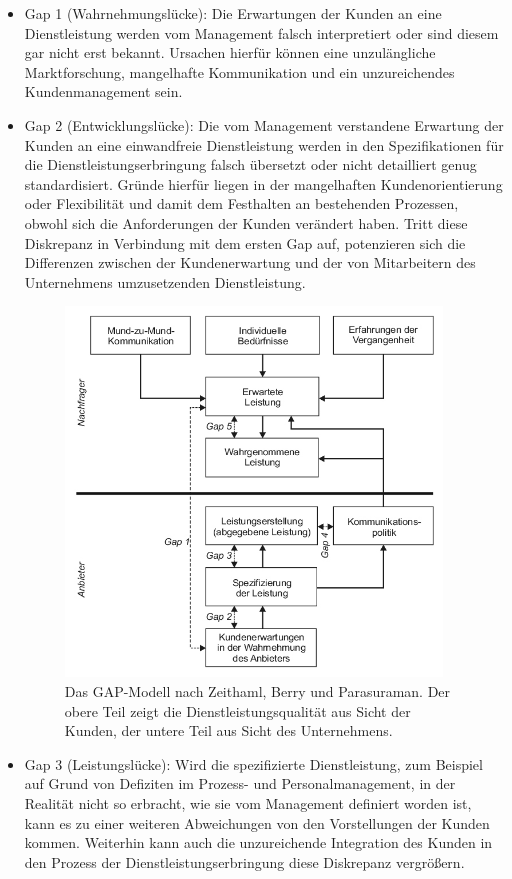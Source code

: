 \begin{itemize}
\item Gap 1 (Wahrnehmungslücke): Die Erwartungen der Kunden an eine Dienstleistung werden vom Management falsch interpretiert oder sind diesem gar nicht erst bekannt. Ursachen hierfür können eine unzulängliche Marktforschung, mangelhafte Kommunikation und ein unzureichendes Kundenmanagement sein.
\newpage
\item Gap 2 (Entwicklungslücke): Die vom Management verstandene Erwartung der Kunden an eine einwandfreie Dienstleistung werden in den Spezifikationen für die Dienstleistungserbringung falsch übersetzt oder nicht detailliert genug standardisiert. Gründe hierfür liegen in der mangelhaften Kundenorientierung oder Flexibilität und damit dem Festhalten an bestehenden Prozessen, obwohl sich die Anforderungen der Kunden verändert haben. Tritt diese Diskrepanz in Verbindung mit dem ersten Gap auf, potenzieren sich die Differenzen zwischen der Kundenerwartung und der von Mitarbeitern des Unternehmens umzusetzenden Dienstleistung.
\begin{figure} [t]
\centering
\includegraphics[width=10cm]{B2B/Bilder/gap1988}
\caption[GAP-Modell]{Das GAP-Modell nach Zeithaml, Berry und Parasuraman. Der obere Teil zeigt die Dienstleistungsqualität aus Sicht der Kunden, der untere Teil aus Sicht des Unternehmens. \protect\footnotemark}
\label{gap1985}
\end{figure}
\item Gap 3 (Leistungslücke): Wird die spezifizierte Dienstleistung, zum Beispiel auf Grund von Defiziten im Prozess- und Personalmanagement, in der Realität nicht so erbracht, wie sie vom Management definiert worden ist, kann es zu einer weiteren Abweichungen von den Vorstellungen der Kunden kommen. Weiterhin kann auch die unzureichende Integration des Kunden in den Prozess der Dienstleistungserbringung diese Diskrepanz vergrößern.

\end{itemize}
